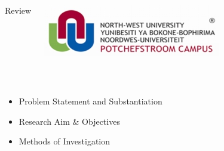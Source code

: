 \documentclass[11pt]{beamer}
\begin{document}
	\begin{frame}[t]
		\begin{columns}[onlytextwidth]
				\begin{Large}
					\vspace{-0.2cm}
					\color{beamer@maroon}Review
				\end{Large}
				\includegraphics[scale=0.4]{nwulogo.jpeg}
		\end{columns}
		\hspace{0.1cm}
		\newline
		\noindent\makebox[\linewidth]{\rule{\paperwidth}{0.4pt}}\\
		[1cm]
		\begin{itemize}
			\item Problem Statement and Substantiation
			\item Research Aim \& Objectives
			\item Methods of Investigation
		\end{itemize}
	\end{frame}
\end{document}
